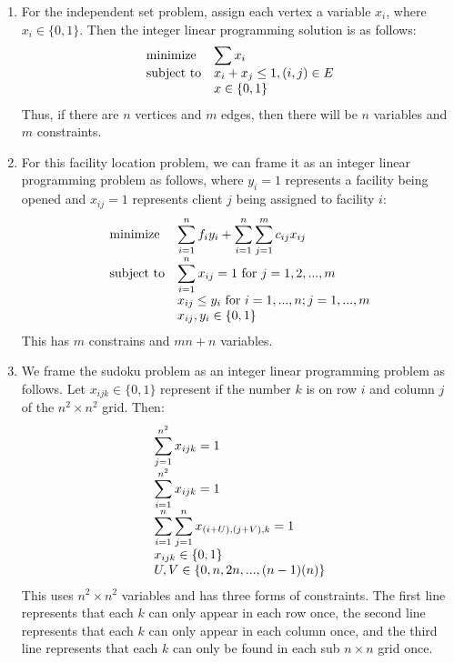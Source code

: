 \documentclass{article}
\begin{document}
\begin{enumerate}
\item For the independent set problem, assign each vertex a variable $x_i$, where $x_i \in \{0,1\}$. 
Then the integer linear programming solution is as follows:
\begin{equation*}
\begin{array}{ll@{}ll}
\text{minimize} & \displaystyle\sum x_i\\
\text{subject to} & x_i + x_j \leq 1 &, (i,j) \in E\\
& x \in \{0,1\} &
\end{array}
\end{equation*}
Thus, if there are $n$ vertices and $m$ edges, then there will be $n$ variables and $m$ constraints. 

\item For this facility location problem, we can frame it as an integer linear programming problem as follows, where $y_i = 1$ represents a facility being opened and $x_{ij} = 1$ represents client $j$ being assigned to facility $i$:
\begin{equation*}
\begin{array}{ll@{}ll}
\text{minimize} & \displaystyle\sum_{i = 1}^n f_i y_i + \displaystyle\sum_{i = 1}^n\displaystyle\sum_{j = 1}^m c_{ij}x_{ij}\\ 
\text{subject to} & \displaystyle\sum_{i = 1}^n x_{ij} = 1 \text{ for } j = 1,2,...,m \\
& x_{ij} \leq y_i \text{ for } i = 1,...,n; j = 1,...,m \\
& x_{ij},y_i \in \{0,1\} &
\end{array}
\end{equation*}
This has $m$ constrains and $mn + n$ variables. 

\item We frame the sudoku problem as an integer linear programming problem as follows.
Let $x_{ijk} \in \{0,1\}$ represent if the number $k$ is on row $i$ and column $j$ of the $n^2 \times n^2$ grid. 
Then:
\begin{equation*}
\begin{array}{ll@{}ll}
\displaystyle\sum_{j = 1}^{n^2} x_{ijk} = 1 \\
\displaystyle\sum_{i = 1}^{n^2} x_{ijk} = 1 \\
\displaystyle\sum_{i = 1}^{n} \displaystyle\sum_{j = 1}^{n} x_{(i + U),(j + V),k} = 1\\
x_{ijk} \in \{0,1\} \\
U,V \in \{0,n,2n,...,(n-1)(n)\}
\end{array}
\end{equation*}
This uses $n^2 \times n^2$ variables and has three forms of constraints.
The first line represents that each $k$ can only appear in each row once, the second line represents that each $k$ can only appear in each column once, and the third line represents that each $k$ can only be found in each sub $n \times n$ grid once. 

\end{enumerate}
\end{document}
